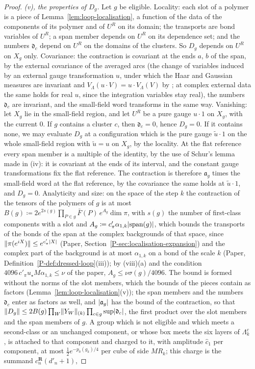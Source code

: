 \documentclass[11pt]{preprint}
\DeclarePairedDelimiter{\abs}{\lvert}{\rvert}
\DeclarePairedDelimiter{\norm}{\lVert}{\rVert}
\numberwithin{equation}{section}
\theoremstyle{definition}
\theoremstyle{remark}
\theoremstyle{plain}
\begin{document}
\begin{proof}
\emph{(v), the properties of $D_g$.} Let $g$ be eligible. Locality: each slot of a polymer is a piece of Lemma~\ref{lem:loop-localisation}, a function of the data of the components of its polymer and of $U^R$ on its domain; the transports are bond variables of $U^R$; a span member depends on $U^R$ on its dependence set; and the numbers $\mathfrak d_c$ depend on $U^R$ on the domains of the clusters. So $D_g$ depends on $U^R$ on $X_g$ only. Covariance: the contraction is covariant at the ends $a$, $b$ of the span, by the external covariance of the averaged arcs (the change of variables induced by an external gauge transformation $u$, under which the Haar and Gaussian measures are invariant and $V_\Lambda(u \cdot V) = u \cdot V_\Lambda(V)$ by \cite[Proposition~1, p.~194]{BalabanLFR1}; at complex external data the same holds for real $u$, since the integration variables stay real), the numbers $\mathfrak d_c$ are invariant, and the small-field word transforms in the same way. Vanishing: let $X_g$ lie in the small-field region, and let $U^R$ be a pure gauge $u \cdot 1$ on $X_g$, with the current $0$. If $g$ contains a cluster $c$, then $\mathfrak d_c = 0$, hence $D_g = 0$. If it contains none, we may evaluate $D_g$ at a configuration which is the pure gauge $\tilde u \cdot 1$ on the whole small-field region with $\tilde u = u$ on $X_g$, by the locality. At the flat reference every span member is a multiple of the identity, by the use of Schur's lemma made in (iv): it is covariant at the ends of its interval, and the constant gauge transformations fix the flat reference. The contraction is therefore $\mathfrak a_g$ times the small-field word at the flat reference, by the covariance the same holds at $\tilde u \cdot 1$, and $D_g = 0$. Analyticity and size: on the space of the step $k$ the contraction of the tensors of the polymers of $g$ is at most $B(g) \coloneqq 2e^{2s(g)}\prod_{P \in g}\bar F(P)\,e^{A_g}\dim\pi$, with $s(g)$ the number of first-class components with a slot and $A_g \coloneqq c'_\pi\alpha_{1,k}\abs{\mathrm{span}(g)}$, which bounds the transports of the bonds of the span at the complex backgrounds of that space, since $\norm{\pi(e^{iX})} \leq e^{c'_\pi\abs X}$ (Paper, Section~\ref{P-sec:localisation-expansion}) and the complex part of the background is at most $\alpha_{1,k}$ on a bond of the scale $k$ (Paper, Definition~\ref{P-def:dressed-loop}(iii)); by (viii)(a) and the condition $4096\,c'_\pi u_\star M\alpha_{1,k} \leq \nu$ of the paper, $A_g \leq \nu\sigma(g)/4096$. The bound is formed without the norms of the slot members, which the bounds of the pieces contain as factors (Lemma~\ref{lem:loop-localisation}(v)); the span members and the numbers $\mathfrak d_c$ enter as factors as well, and $\abs{\mathfrak a_g}$ has the bound of the contraction, so that $\norm{D_g} \leq 2B(g)\prod_W\norm{Y_W}_{(k)}\prod_{c \in g}\sup\abs{\mathfrak d_c}$, the first product over the slot members and the span members of $g$. A group which is not eligible and which meets a second-class or an unchanged component, or whose box meets the six layers of $\Lambda_k^c$, is attached to that component and charged to it, with amplitude $\hat c_1$ per component, at most $\frac12e^{-p_0(g_k)/4}$ per cube of side $MR_k$; this charge is the summand $c^{\mathbf R}_n(d'_n + 1)$, 
\end{proof}
\end{document}
